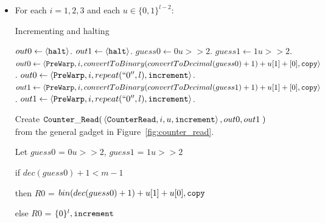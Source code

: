 \begin{itemize}

    \item For each $i = 1,2,3$ and each $u \in \{0, 1\}^{l-2} $:
    \begin{algorithm}
        \caption{Incrementing and halting}\label{euclid}
        \begin{algorithmic}[1]
                    \State $out0 \gets \left\langle {\tt halt} \right\rangle$.
                    \State $out1 \gets \left\langle {\tt halt} \right\rangle$.
                \Else
                    \State $guess0 \gets 0u >> 2$.
                    \State $guess1 \gets 1u >> 2$.
                        \State $out0 \gets \left\langle {\tt PreWarp}, i, convertToBinary(convertToDecimal(guess0) + 1) + u[1] + [0], {\tt copy} \right\rangle$.
                    \Else
                        \State $out0 \gets \left\langle {\tt PreWarp}, i, repeat(``0'', l), {\tt increment} \right\rangle$.
                    \EndIf
                        \State $out1 \gets \left\langle {\tt PreWarp}, i, convertToBinary(convertToDecimal(guess1) + 1) + u[1] + [0], {\tt copy} \right\rangle$.
                    \Else
                        \State $out1 \gets \left\langle {\tt PreWarp}, i, repeat(``0'', l), {\tt increment} \right\rangle$.
                    \EndIf
                \EndIf
            \EndFunction
        \end{algorithmic}
    \end{algorithm}

    Create
    $\begin{aligned}[t]
        {\tt Counter\_Read}(& \left\langle {\tt CounterRead}, i, u, {\tt increment} \right\rangle, out0, out1 \;)
    \end{aligned}$\\from the general gadget in Figure~\ref{fig:counter_read}.

    Let $guess0$ = $0u >> 2$, $guess1$ = $1u >> 2$

    \vspace{.5cm}
    if $dec(guess0) + 1 < m - 1$

    then $R0$ = $bin(dec(guess0) + 1)+u[1]+u[0], {\tt copy}$

    else $R0$ = $\{0 \}^l, {\tt increment}$


\end{itemize}
